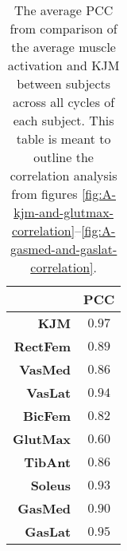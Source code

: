 \begin{table}[]
    \centering
    \caption{The average \acf{PCC} from comparison of the average muscle activation and \ac{KJM} between subjects across all cycles of each subject. This table is meant to outline the correlation analysis from figures \ref{fig:A-kjm-and-glutmax-correlation}--\ref{fig:A-gasmed-and-gaslat-correlation}.}
    \small
    \begin{tabular}{r|c}
         &  \textbf{\ac{PCC}} \\ \hline
        \textbf{\ac{KJM}} & $0.97$ \\
        \textbf{RectFem} & $0.89$ \\
        \textbf{VasMed} & $0.86$ \\
        \textbf{VasLat} & $0.94$ \\
        \textbf{BicFem} & $0.82$ \\
        \textbf{GlutMax} & $0.60$ \\
        \textbf{TibAnt} & $0.86$ \\
        \textbf{Soleus} & $0.93$ \\
        \textbf{GasMed} & $0.90$ \\
        \textbf{GasLat} & $0.95$\\ \hline
    \end{tabular}
    \label{tab:correlation-sumup}
\end{table}